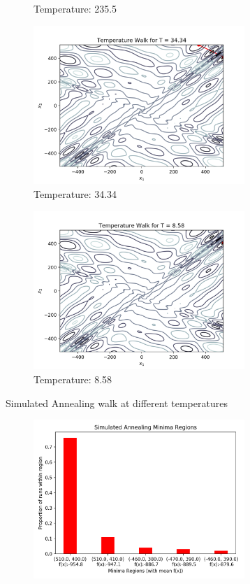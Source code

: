 \documentclass[12pt]{article}
\begin{document}
\begin{enumerate}
\begin{enumerate}
\begin{itemize}
\begin{figure}[ht]
\begin{subfigure}{8cm}
		\caption{Temperature: 235.5}
		\end{subfigure}\vspace{10pt}
		\begin{subfigure}{8cm}
		\centering\includegraphics[width=8cm]{a_T_3}
		\caption{Temperature: 34.34}
		\end{subfigure}%
		\begin{subfigure}{8cm}
		\centering\includegraphics[width=8cm]{a_T_4}
		\caption{Temperature: 8.58}
		\end{subfigure}
		\caption{Simulated Annealing walk at different temperatures}
		\label{fig1}
		\end{figure}
		\begin{figure}[H]
		\centering
		\begin{subfigure}{8cm}
		\centering
		\includegraphics[width=8cm]{a_hist_bin}

\end{subfigure}
\end{figure}
\end{itemize}
\end{enumerate}
\end{enumerate}
\end{document}
